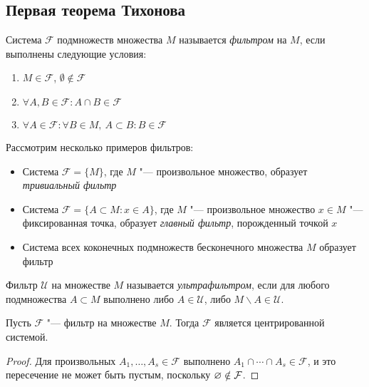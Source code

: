 \subsection{Первая теорема Тихонова}

\begin{definition}
    Система $\mathcal{F}$ подмножеств множества $M$ называется \textit{фильтром} на $M$, если выполнены следующие условия:
    \begin{enumerate}
        \item $M\in\mathcal{F}$, $\emptyset\notin \mathcal{F}$
        \item $\forall A, B \in \mathcal{F}: A\cap B \in \mathcal{F}$
        \item $\forall A\in\mathcal{F}: \forall B \in M,~A\subset B: B\in\mathcal{F}$
    \end{enumerate}
\end{definition}

\begin{example}
    Рассмотрим несколько примеров фильтров:
    \begin{itemize}
        \item Система $\mathcal{F} = \lbrace M\rbrace$, где $M$ "--- произвольное множество, образует \textit{тривиальный фильтр}

        \item Система $\mathcal{F} = \lbrace A \subset M: x\in A\rbrace$, где $M$ "--- произвольное множество $x \in M$ "--- фиксированная точка, образует \textit{главный фильтр}, порожденный точкой $x$
        
        \item Система всех коконечных подмножеств бесконечного множества $M$ образует фильтр
    \end{itemize}
\end{example}

\begin{definition}
    Фильтр $\mathcal{U}$ на множестве $M$ называется \textit{ультрафильтром}, если для любого подмножества $A \subset M$ выполнено либо $A \in \mathcal{U}$, либо $M\backslash A\in\mathcal{U}$.
\end{definition}

\begin{proposition}
    Пусть $\mathcal{F}$ "--- фильтр на множестве $M$. Тогда $\mathcal{F}$ является центрированной системой.
\end{proposition}

\begin{proof}
    Для произвольных $A_1, \ldots, A_s \in \mathcal{F}$ выполнено $A_1 \cap \dotsb \cap A_s\in\mathcal{F}$, и это пересечение не может быть пустым, поскольку $\varnothing \notin \mathcal F$.
\end{proof}

